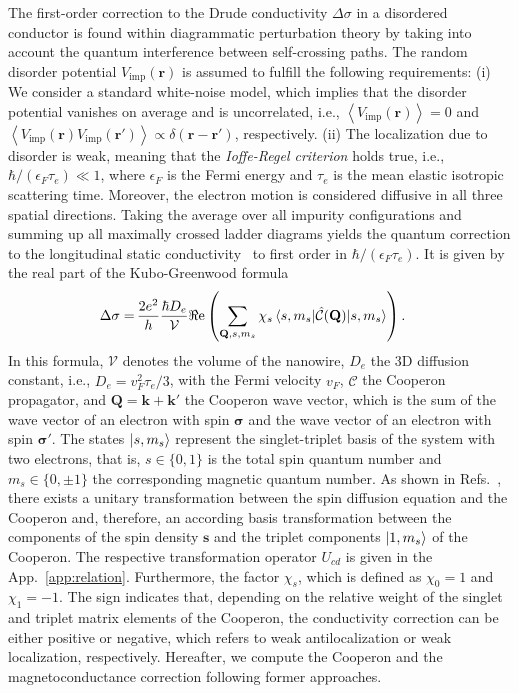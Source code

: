 \documentclass[superscriptaddress,noshowpacs,noshowkeys, twocolumn, floatfix,aps, prb,reprint]{revtex4-1}
\begin{document}
The first-order correction to the Drude conductivity $\Delta\sigma$ in a disordered conductor is found within diagrammatic perturbation theory by
taking into account the quantum interference between self-crossing paths.
The random disorder potential $V_\text{imp}(\mathbf{r})$ is assumed to fulfill the following requirements: (i) We consider a standard white-noise
model, which implies that the disorder potential vanishes on average and is uncorrelated, i.e., $\left\langle V_\text{imp}(\mathbf{r})\right\rangle=0$ and $\left\langle V_\text{imp}(\mathbf{r})V_\text{imp}(\mathbf{r'})\right\rangle\propto\delta(\mathbf{r}-\mathbf{r'})$, respectively.
(ii) The localization due to disorder is weak, meaning that the \textit{Ioffe-Regel criterion} holds true, i.e., $\hbar/(\epsilon_F \tau_e)\ll 1$, where $\epsilon_F$ is the Fermi energy and $\tau_e$ is the mean elastic isotropic scattering time.  
Moreover, the electron motion is considered diffusive in all three spatial directions.  
Taking the average over all impurity configurations and summing up all maximally crossed ladder diagrams yields the quantum correction to the longitudinal static conductivity~\cite{nagaoka} to first order in $\hbar/(\epsilon_F \tau_e)$.
It is given by the real part of the Kubo-Greenwood formula
%
\begin{align}
\Delta\sigma=&\,\frac{2e^2 }{h}\frac{\hbar D_e}{ \mathcal{V}}\Re \text{e}\left(\sum_{\mathbf{Q},s,m_s}\chi_s\braket{s,m_s|\hat{\mathcal{C}}(\mathbf{Q})|s,m_s}\right).
\label{conductivity}
\end{align}
%
In this formula, $\mathcal{V}$ denotes the volume of the nanowire, $D_e$ the
3D diffusion constant, i.e., $D_e=v_F^2 \tau_e/3$, with
the Fermi velocity $v_F$, $\hat{\mathcal{C}}$ the Cooperon propagator, and
$\mathbf{Q}=\mathbf{k}+\mathbf{k'}$ the Cooperon wave vector, which is the sum of the wave vector of an electron with spin $\boldsymbol{\sigma}$ and the wave vector of an electron with spin $\boldsymbol{\sigma'}$.
The states $\ket{s,m_s}$ represent the singlet-triplet basis of the system with two electrons, that is, $s\in\{0,1\}$ is the total spin quantum number and $m_s\in\{0,\pm1\}$ the corresponding magnetic quantum number.
As shown in Refs.~, there exists a unitary transformation between the spin diffusion equation and the Cooperon and, therefore, an according basis transformation between the components of the spin density $\mathbf{s}$ and the triplet components $\ket{1,m_s}$ of the Cooperon.
The respective transformation operator $U_{cd}$ is given in the App.~\ref{app:relation}.
Furthermore, the factor $\chi_s$, which is defined as $\chi_0=1$ and $\chi_1=-1$.
The sign indicates that, depending on the relative weight of the singlet and triplet matrix elements of the Cooperon, the conductivity correction can be either positive or negative, which refers to weak antilocalization or weak localization, respectively. 
Hereafter, we compute the Cooperon and the magnetoconductance correction following former approaches.\cite{Kettemann2007a, Wenk2010, Wenk2011,wenkbook,Kammermeier2016,Kammermeier2017}
%
%
\end{document}
